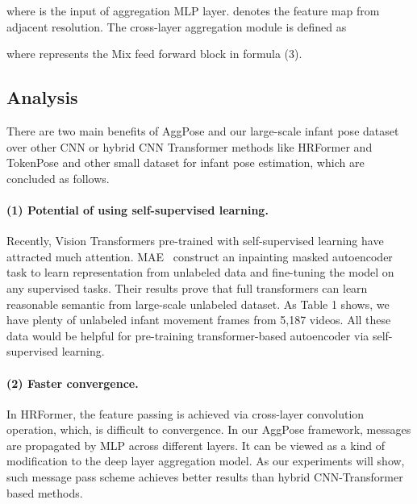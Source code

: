 \documentclass{article}
\begin{document}
where  is the input of aggregation MLP layer.  denotes the feature map from adjacent resolution. The cross-layer aggregation module is defined as



where  represents the Mix feed forward block in formula (3).


\subsection{Analysis}

There are two main benefits of AggPose and our large-scale infant pose dataset over other CNN or hybrid CNN Transformer methods like HRFormer and TokenPose and other small dataset for infant pose estimation, which are concluded as follows.

\paragraph{(1) Potential of using self-supervised learning.} Recently, Vision Transformers pre-trained with self-supervised learning have attracted much attention. MAE~\cite{he2021masked} construct an inpainting masked autoencoder task to learn representation from unlabeled data and fine-tuning the model on any supervised tasks. Their results prove that full transformers can learn reasonable semantic from large-scale unlabeled dataset. As Table 1 shows, we have plenty of unlabeled infant movement frames from 5,187 videos. All these data would be helpful for pre-training transformer-based autoencoder via self-supervised learning.

\paragraph{(2) Faster convergence.} In HRFormer, the feature passing is achieved via cross-layer convolution operation, which, is difficult to convergence. In our AggPose framework, messages are propagated by MLP across different layers. It can be viewed as a kind of modification to the deep layer aggregation model. As our experiments will show, such message pass scheme achieves better results than hybrid CNN-Transformer based methods.
\end{document}
